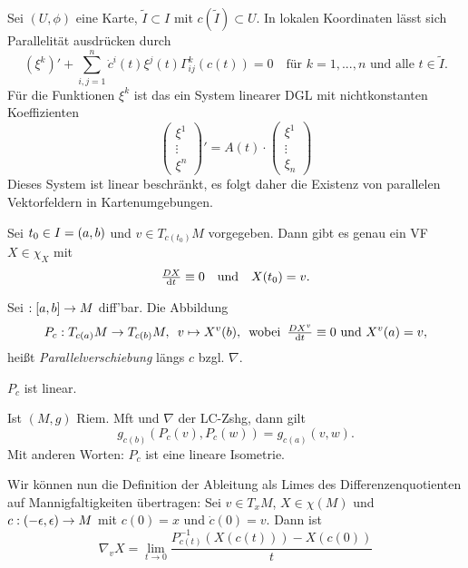 \documentclass{cheat-sheet}
\newcommand{\coord}[1]{\tfrac{\partial^\phi}{\partial x^{#1}}} %
\begin{document}
\begin{bem}
  Sei $(U, \phi)$ eine Karte, $\tilde{I} \subset I$ mit $c(\tilde{I}) \subset U$.
  In lokalen Koordinaten lässt sich Parallelität ausdrücken durch
  \[
    (\xi^{k})' + \sum_{i,j=1}^n \dot{c}^i(t) \xi^j (t) \Gamma_{ij}^k(c(t)) = 0
    \quad \text{für $k = 1, ..., n$ und alle $t \in \tilde{I}$.}
  \]
  Für die Funktionen $\xi^k$ ist das ein System linearer DGL mit nichtkonstanten Koeffizienten
  \[
    \begin{pmatrix}
      \xi^1 \\
      \vdots \\
      \xi^n
    \end{pmatrix}' = A(t) \cdot
    \begin{pmatrix}
      \xi^1 \\
      \vdots \\
      \xi_n
    \end{pmatrix}
  \]
  Dieses System ist linear beschränkt, es folgt daher die Existenz von parallelen Vektorfeldern in Kartenumgebungen.
\end{bem}

\begin{satz}
  Sei $t_0 \in I = \left( a, b \right)$ und $v \in T_{c(t_0)} M$ vorgegeben. Dann gibt es genau ein VF $X \in \chi_X$ mit
  \[
    \tfrac{D X}{\mathrm{d} t} \equiv 0
    \quad \text{und} \quad
    X(t_0) = v.
  \]
\end{satz}

\begin{defn}
  Sei $ : \left[ a, b \right] \to M$ diff'bar. Die Abbildung
  \[
    P_c : T_{c(a)} M \to T_{c(b)} M, \enspace v \mapsto X^{v}(b),
    \enspace \text{wobei} \enspace \tfrac{D X^v}{\mathrm{d} t} \equiv 0 \text{ und } X^{v}(a) = v,
  \]
  heißt \emph{Parallelverschiebung} längs $c$ bzgl. $\nabla$.
\end{defn}

\begin{satz}
  $P_c$ ist linear.
\end{satz}

\begin{satz}
  Ist $(M, g)$ Riem. Mft und $\nabla$ der LC-Zshg, dann gilt
  \[ g_{c(b)}(P_c(v), P_c(w)) = g_{c(a)}(v, w). \]
  Mit anderen Worten: $P_c$ ist eine lineare Isometrie.
\end{satz}

\begin{bem}
  Wir können nun die Definition der Ableitung als Limes des Differenzenquotienten auf Mannigfaltigkeiten übertragen: Sei $v \in T_x M$, $X \in \chi(M)$ und $c : \left( -\epsilon, \epsilon \right) \to M$ mit $c(0) = x$ und $\dot{c}(0) = v$. Dann ist
  \[ \nabla_v X = \lim_{t \to 0} \frac{P_{c(t)}^{-1}(X(c(t))) - X(c(0))}{t} \]
\end{bem}
\end{document}
